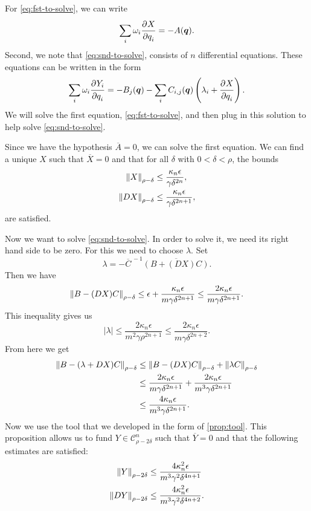 \documentclass[twoside,letterpaper,11pt]{article}
\numberwithin{equation}{section}
\begin{document}
For \cref{eq:fst-to-solve}, we can write
\begin{equation*}
  \sum_i \omega_i \frac{\strut\partial^{}X}{\strut\partial q_i^{}} = -A(\bm{q}).
\end{equation*}
Second, we note that \cref{eq:snd-to-solve}, consists of $n$ differential
equations.
These equations can be written in the form
\begin{equation*}  
  \sum_i \omega_i \frac{\strut\partial^{}Y_i}{\strut\partial q_i^{}} = -B_j(\bm{q}) - \sum_i C_{i,j}(\bm{q}) \left(
  \lambda_i + \frac{\strut\partial^{}X}{\strut\partial q_i^{}} \right).
\end{equation*}
We will solve the first equation, \cref{eq:fst-to-solve}, and then plug in this
solution to help solve \cref{eq:snd-to-solve}.

Since we have the hypothesis $\overline{A} = 0$, we can solve the first
equation.
We can find a unique $X$ such that $\overline{X} = 0$ and that for all $\delta$
with $0 < \delta < \rho$, the bounds
\begin{align*}
  \norm{X}_{\rho - \delta} &\leq \frac{\kappa_n \epsilon}{\gamma \delta^{2n}},\\
  \norm{\Dif X}_{\rho - \delta} &\leq \frac{\kappa_n \epsilon}{\gamma
                   \delta^{2n+1}},
\end{align*}
are satisfied.

Now we want to solve \cref{eq:snd-to-solve}.
In order to solve it, we need its right hand side to be zero.
For this we need to choose $\lambda$.
Set
\begin{equation*}
  \lambda = - \overline{C}^{\,-1} \overline{(B + (DX)C)}.
\end{equation*}
Then we have
\begin{equation*}
  \norm{B - (DX)C}_{\rho - \delta} \leq \epsilon + \frac{\kappa_n \epsilon}{m
    \gamma \delta^{2n+1}} \leq \frac{2 \kappa_n \epsilon}{m \gamma \delta^{2n +
  1}}.
\end{equation*}
This inequality gives us
\begin{equation*}
  |\lambda| \leq \frac{2\kappa_n \epsilon}{m^2 \gamma \rho^{2n+1}} \leq \frac{2
    \kappa_n \epsilon}{m \gamma \delta^{2n + 2}}.
\end{equation*}
From here we get
\begin{align*}
  \norm{B - (\lambda + DX)C}_{\rho - \delta}
  &\leq \norm{B - (DX)C}_{\rho - \delta} + \norm{\lambda C}_{\rho - \delta}\\
  &\leq \frac{2 \kappa_n \epsilon}{m \gamma \delta^{2n + 1}} + \frac{2\kappa_n
    \epsilon}{m^3 \gamma \delta^{2n+1}}\\
  &\leq \frac{4 \kappa_n \epsilon}{m^3 \gamma \delta^{2n+1}}.
\end{align*}
Now we use the tool that we developed in the form of \cref{prop:tool}.
This proposition allows us to fund $Y \in \mathcal{C}_{\rho - 2\delta}^n$ such
that $\overline{Y} = 0$ and that the following estimates are satisfied:
\begin{align*}
  \norm{Y}_{\rho - 2\delta} &\leq \frac{4\kappa_n^2 \epsilon}{m^3 \gamma^2
                              \delta^{4n+1}}\\
  \norm{\Dif Y}_{\rho - 2\delta} &\leq \frac{4\kappa_n^2 \epsilon}{m^3 \gamma^2
                    \delta^{4n+2}}.
\end{align*}
\end{document}
